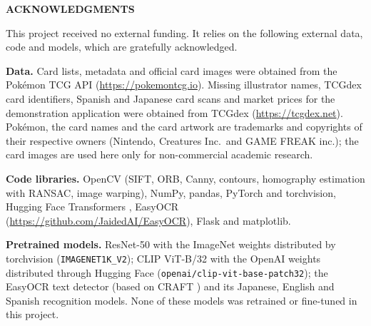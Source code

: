 \begin{center}
    {\fontsize{18pt}{0pt} \MakeUppercase{\textbf{acknowledgments}}}
\vspace*{24pt}
\end{center}

This project received no external funding. It relies on the following external data, code and models, which are gratefully acknowledged.

\textbf{Data.} Card lists, metadata and official card images were obtained from the Pok\'emon TCG API (\url{https://pokemontcg.io}). Missing illustrator names, TCGdex card identifiers, Spanish and Japanese card scans and market prices for the demonstration application were obtained from TCGdex (\url{https://tcgdex.net}). Pok\'emon, the card names and the card artwork are trademarks and copyrights of their respective owners (Nintendo, Creatures Inc.\ and GAME FREAK inc.); the card images are used here only for non-commercial academic research. 

\textbf{Code libraries.} OpenCV (SIFT, ORB, Canny, contours, homography estimation with RANSAC, image warping), NumPy, pandas, PyTorch \citep{paszke2019pytorch} and torchvision, Hugging Face Transformers \citep{wolf2020transformers}, EasyOCR (\url{https://github.com/JaidedAI/EasyOCR}), Flask and matplotlib.

\textbf{Pretrained models.} ResNet-50 \citep{he2016resnet} with the ImageNet weights distributed by torchvision (\texttt{IMAGENET1K\_V2}); CLIP ViT-B/32 \citep{radford2021clip} with the OpenAI weights distributed through Hugging Face (\texttt{openai/clip-vit-base-patch32}); the EasyOCR text detector (based on CRAFT \citep{baek2019craft}) and its Japanese, English and Spanish recognition models. None of these models was retrained or fine-tuned in this project.

